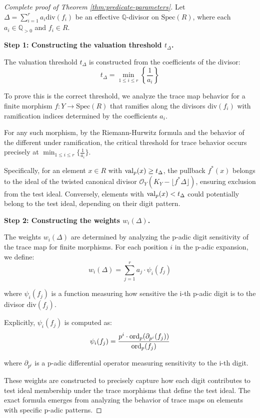 \begin{proof}[Complete proof of Theorem \ref{thm:predicate-parameters}]
Let $\Delta = \sum_{i=1}^{r} a_i \text{div}(f_i)$ be an effective $\mathbb{Q}$-divisor on $\text{Spec}(R)$, where each $a_i \in \mathbb{Q}_{>0}$ and $f_i \in R$.

\textbf{Step 1: Constructing the valuation threshold $t_\Delta$.}

The valuation threshold $t_\Delta$ is constructed from the coefficients of the divisor:
$$t_\Delta = \min_{1 \leq i \leq r} \left\{\frac{1}{a_i}\right\}$$

To prove this is the correct threshold, we analyze the trace map behavior for a finite morphism $f: Y \to \text{Spec}(R)$ that ramifies along the divisors $\text{div}(f_i)$ with ramification indices determined by the coefficients $a_i$.

For any such morphism, by the Riemann-Hurwitz formula and the behavior of the different under ramification, the critical threshold for trace behavior occurs precisely at $\min_{1 \leq i \leq r} \{\frac{1}{a_i}\}$.

Specifically, for an element $x \in R$ with $\operatorname{val}_p(x) \geq t_\Delta$, the pullback $f^*(x)$ belongs to the ideal of the twisted canonical divisor $\mathcal{O}_Y(K_Y - \lfloor f^*\Delta\rfloor)$, ensuring exclusion from the test ideal. Conversely, elements with $\operatorname{val}_p(x) < t_\Delta$ could potentially belong to the test ideal, depending on their digit pattern.

\textbf{Step 2: Constructing the weights $w_i(\Delta)$.}

The weights $w_i(\Delta)$ are determined by analyzing the p-adic digit sensitivity of the trace map for finite morphisms. For each position $i$ in the p-adic expansion, we define:
$$w_i(\Delta) = \sum_{j=1}^{r} a_j \cdot \psi_i(f_j)$$

where $\psi_i(f_j)$ is a function measuring how sensitive the i-th p-adic digit is to the divisor $\text{div}(f_j)$.

Explicitly, $\psi_i(f_j)$ is computed as:
$$\psi_i(f_j) = \frac{p^i \cdot \operatorname{ord}_p(\partial_{p^i}(f_j))}{\operatorname{ord}_p(f_j)}$$

where $\partial_{p^i}$ is a p-adic differential operator measuring sensitivity to the i-th digit.

These weights are constructed to precisely capture how each digit contributes to test ideal membership under the trace morphisms that define the test ideal. The exact formula emerges from analyzing the behavior of trace maps on elements with specific p-adic patterns.


\end{proof}
